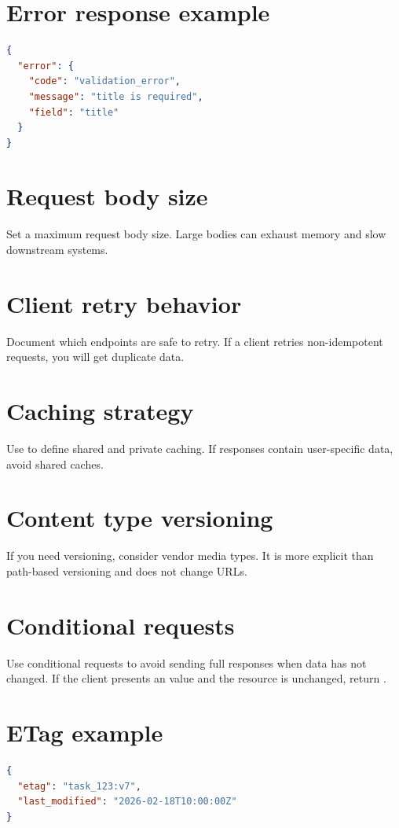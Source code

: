 \section{Error response example}
\begin{lstlisting}[language=JSON]
{
  "error": {
    "code": "validation_error",
    "message": "title is required",
    "field": "title"
  }
}
\end{lstlisting}

\section{Request body size}
Set a maximum request body size.
Large bodies can exhaust memory and slow downstream systems.

\section{Client retry behavior}
Document which endpoints are safe to retry.
If a client retries non-idempotent requests, you will get duplicate data.

\section{Caching strategy}
Use  to define shared and private caching.
If responses contain user-specific data, avoid shared caches.

\section{Content type versioning}
If you need versioning, consider vendor media types.
It is more explicit than path-based versioning and does not change URLs.

\section{Conditional requests}
Use conditional requests to avoid sending full responses when data has not changed.
If the client presents an  value and the resource is unchanged,
return .

\section{ETag example}
\begin{lstlisting}[language=JSON]
{
  "etag": "task_123:v7",
  "last_modified": "2026-02-18T10:00:00Z"
}
\end{lstlisting}

